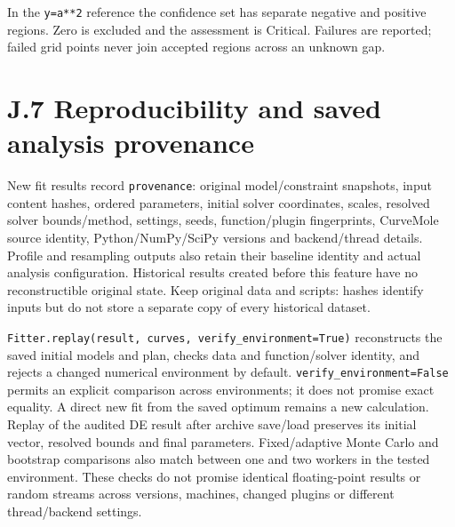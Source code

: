 \documentclass[
  10pt,
  a4paper,
  oneside]{scrreprt}
\begin{document}
In the \texttt{y=a**2} reference the confidence set has separate
negative and positive regions. Zero is excluded and the assessment is
Critical. Failures are reported; failed grid points never join accepted
regions across an unknown gap.

\hypertarget{j.7-reproducibility-and-saved-analysis-provenance}{%
\section{J.7 Reproducibility and saved analysis
provenance}\label{j.7-reproducibility-and-saved-analysis-provenance}}

New fit results record \texttt{provenance}: original model/constraint
snapshots, input content hashes, ordered parameters, initial solver
coordinates, scales, resolved solver bounds/method, settings, seeds,
function/plugin fingerprints, CurveMole source identity,
Python/NumPy/SciPy versions and backend/thread details. Profile and
resampling outputs also retain their baseline identity and actual
analysis configuration. Historical results created before this feature
have no reconstructible original state. Keep original data and scripts:
hashes identify inputs but do not store a separate copy of every
historical dataset.

\texttt{Fitter.replay(result,\ curves,\ verify\_environment=True)}
reconstructs the saved initial models and plan, checks data and
function/solver identity, and rejects a changed numerical environment by
default. \texttt{verify\_environment=False} permits an explicit
comparison across environments; it does not promise exact equality. A
direct new fit from the saved optimum remains a new calculation. Replay
of the audited DE result after archive save/load preserves its initial
vector, resolved bounds and final parameters. Fixed/adaptive Monte Carlo
and bootstrap comparisons also match between one and two workers in the
tested environment. These checks do not promise identical floating-point
results or random streams across versions, machines, changed plugins or
different thread/backend settings.
\end{document}
